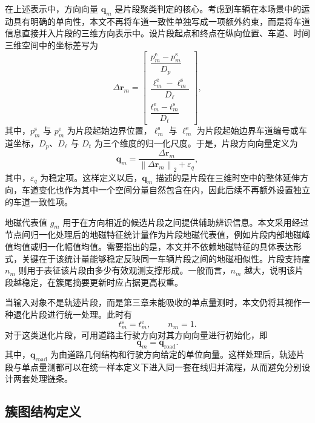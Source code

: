 \documentclass{xdupgthesis}
\begin{document}
在上述表示中，方向向量 $\mathbf{q}_m$ 是片段聚类判定的核心。考虑到车辆在本场景中的运动具有明确的单向性，本文不再将车道一致性单独写成一项额外约束，而是将车道信息直接并入片段的三维方向表示中。设片段起点和终点在纵向位置、车道、时间三维空间中的坐标差写为
\begin{equation}
	\Delta \mathbf{r}_m=
	\begin{bmatrix}
		\dfrac{p_m^{\mathrm{e}}-p_m^{\mathrm{s}}}{D_p}\\[8pt]
		\dfrac{\ell_m^{\mathrm{e}}-\ell_m^{\mathrm{s}}}{D_{\ell}}\\[8pt]
		\dfrac{t_m^{\mathrm{e}}-t_m^{\mathrm{s}}}{D_t}
	\end{bmatrix},
\end{equation}
其中，$p_m^{\mathrm{s}}$ 与 $p_m^{\mathrm{e}}$ 为片段起始边界位置，$\ell_m^{\mathrm{s}}$ 与 $\ell_m^{\mathrm{e}}$ 为片段起始边界车道编号或车道坐标，$D_p$、$D_{\ell}$ 与 $D_t$ 为三个维度的归一化尺度。于是，片段方向向量定义为
\begin{equation}
	\mathbf{q}_m=
	\frac{\Delta \mathbf{r}_m}{\left\|\Delta \mathbf{r}_m\right\|_2+\varepsilon_q},
\end{equation}
其中，$\varepsilon_q$ 为稳定项。这样定义以后，$\mathbf{q}_m$ 描述的是片段在三维时空中的整体延伸方向，车道变化也作为其中一个空间分量自然包含在内，因此后续不再额外设置独立的车道一致性项。

地磁代表值 $g_m$ 用于在方向相近的候选片段之间提供辅助辨识信息。本文采用经过节点间归一化处理后的地磁特征统计量作为片段地磁代表值，例如片段内部地磁峰值均值或归一化幅值均值。需要指出的是，本文并不依赖地磁特征的具体表达形式，关键在于该统计量能够稳定反映同一车辆片段之间的地磁相似性。片段支持度 $n_m$ 则用于表征该片段由多少有效观测支撑形成。一般而言，$n_m$ 越大，说明该片段越稳定，在簇尾摘要更新时应占据更高权重。

当输入对象不是轨迹片段，而是第三章未能吸收的单点量测时，本文仍将其视作一种退化片段进行统一处理。此时有
\begin{equation}
	t_m^{\mathrm{s}}=t_m^{\mathrm{e}},\qquad n_m=1.
\end{equation}
对于这类退化片段，可用道路主行驶方向对其方向向量进行初始化，即
\begin{equation}
	\mathbf{q}_m=\mathbf{q}_{\mathrm{road}}.
\end{equation}
其中，$\mathbf{q}_{\mathrm{road}}$ 为由道路几何结构和行驶方向给定的单位向量。这样处理后，轨迹片段与单点量测都可以在统一样本定义下进入同一套在线归并流程，从而避免分别设计两套处理链条。


\subsection{簇图结构定义}
\end{document}
